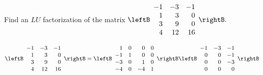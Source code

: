 \begin{enumialphparenastyle}
\begin{ex} Find an $LU$ factorization of the matrix $\leftB 
\begin{array}{rrr}
-1 & -3 & -1 \\ 
1 & 3 & 0 \\ 
3 & 9 & 0 \\ 
4 & 12 & 16
\end{array}
\rightB .$
\begin{sol}
\[
\leftB
\begin{array}{rrr}
-1 & -3 & -1 \\
1 & 3 & 0 \\
3 & 9 & 0 \\
4 & 12 & 16
\end{array}
\rightB = \leftB
\begin{array}{rrrr}
1 & 0 & 0 & 0 \\
-1 & 1 & 0 & 0 \\
-3 & 0 & 1 & 0 \\
-4 & 0 & -4 & 1
\end{array}
\rightB \leftB
\begin{array}{rrr}
-1 & -3 & -1 \\
0 & 0 & -1 \\
0 & 0 & -3 \\
0 & 0 & 0
\end{array}
\rightB
\]
\end{sol}
\end{ex}


\end{enumialphparenastyle}
